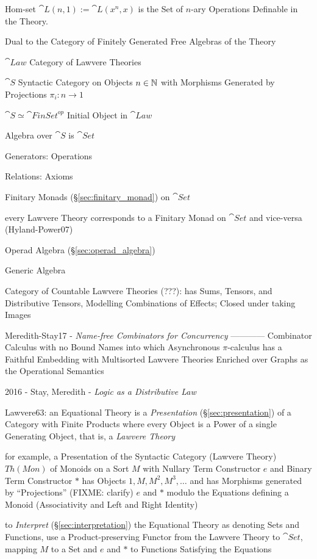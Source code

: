 Hom-set $\cat{L}(n,1) := \cat{L}(x^n,x)$ is the Set of $n$-ary Operations
Definable in the Theory.

Dual to the Category of Finitely Generated Free Algebras of the Theory

$\cat{Law}$ Category of Lawvere Theories

$\cat{S}$ Syntactic Category on Objects $n \in \mathbb{N}$ with Morphisms Generated
by Projections $\pi_i : n \rightarrow 1$

$\cat{S} \simeq \cat{FinSet}^{op}$ Initial Object in $\cat{Law}$

Algebra over $\cat{S}$ is $\cat{Set}$

Generators: Operations

Relations: Axioms

Finitary Monads (\S\ref{sec:finitary_monad}) on $\cat{Set}$

every Lawvere Theory corresponds to a Finitary Monad on $\cat{Set}$ and
vice-versa (Hyland-Power07)

Operad Algebra (\S\ref{sec:operad_algebra})

Generic Algebra

Category of Countable Lawvere Theories (???): has Sums, Tensors, and
Distributive Tensors, Modelling Combinations of Effects; Closed under
taking Images \cite{hyland-power06}

Meredith-Stay17 - \emph{Name-free Combinators for Concurrency} ------------
Combinator Calculus with no Bound Names into which Asynchronous
$\pi$-calculus has a Faithful Embedding with Multisorted Lawvere
Theories Enriched over Graphs as the Operational Semantics

\asterism

2016 - Stay, Meredith - \emph{Logic as a Distributive Law}

Lawvere63: an Equational Theory is a \emph{Presentation}
(\S\ref{sec:presentation}) of a Category with Finite Products
where every Object is a Power of a single Generating Object, that is, a
\emph{Lawvere Theory}

for example, a Presentation of the Syntactic Category (Lawvere Theory) $Th(Mon)$
of Monoids on a Sort $M$ with Nullary Term Constructor $e$ and Binary Term
Constructor $*$ has Objects $1, M, M^2, M^3, \ldots$ and has Morphisms generated
by ``Projections'' (FIXME: clarify) $e$ and $*$ modulo the Equations defining a
Monoid (Associativity and Left and Right Identity)

to \emph{Interpret} (\S\ref{sec:interpretation}) the Equational Theory as
denoting Sets and Functions, use a Product-preserving Functor from the Lawvere
Theory to $\cat{Set}$, mapping $M$ to a Set and $e$ and $*$ to Functions
Satisfying the Equations

